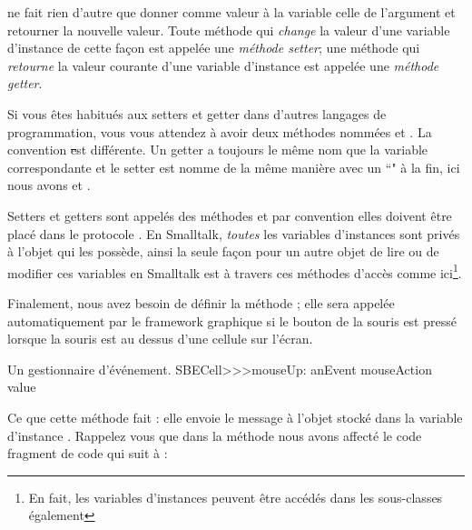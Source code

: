 \documentclass[a4paper,10pt,twoside]{book}
\begin{document}
 ne fait rien d'autre que donner comme valeur à la variable  celle de l'argument et retourner la nouvelle valeur. Toute méthode qui \emph{change} la valeur d'une variable d'instance de cette façon est appelée une \emph{méthode setter}; une méthode qui \emph{retourne} la valeur courante d'une variable d'instance est appelée une \emph{méthode getter}.

Si vous êtes habitués aux setters et getter dans d'autres langages de programmation, vous vous attendez à avoir deux méthodes nommées  et .
La convention \st est différente.
Un getter a toujours le même nom que la variable correspondante et le setter est nomme de la même manière avec un ``\ct{:}" à la fin, ici nous avons  et .

Setters et getters sont appelés des méthodes  et par convention elles doivent être placé dans le protocole .
En Smalltalk, \emph{toutes} les variables d'instances sont privés à l'objet qui les possède, ainsi la seule façon pour un autre objet de lire ou de modifier ces variables en Smalltalk est à travers ces méthodes d'accès comme ici\footnote{En fait, les variables d'instances peuvent être accédés dans les sous-classes également}.


Finalement, nous avez besoin de définir la méthode ; elle sera appelée automatiquement par le framework graphique si le bouton de la souris est pressé lorsque la souris est au dessus d'une cellule sur l'écran.

\begin{method}[sbecellmouseup]{Un gestionnaire d'événement.}
SBECell>>>mouseUp: anEvent
   mouseAction value
\end{method}


Ce que cette méthode fait : elle envoie le message  à l'objet stocké dans la variable d'instance . 
Rappelez vous que dans la méthode  nous avons affecté le code fragment de code qui suit à :
\end{document}
